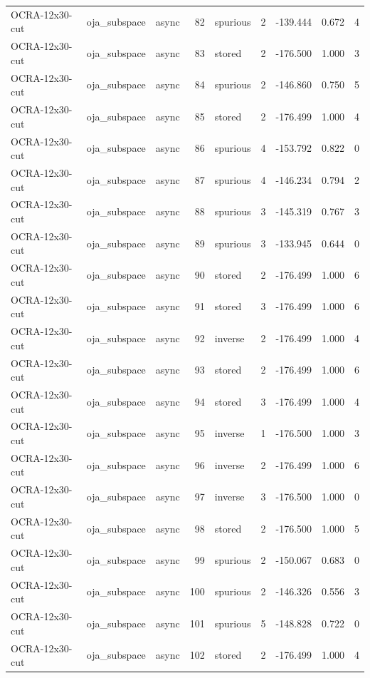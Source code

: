 \begin{tabular}{lllrlrrrr}
OCRA-12x30-cut & oja\_subspace & async & 82 & spurious & 2 & -139.444 & 0.672 & 4 \\
OCRA-12x30-cut & oja\_subspace & async & 83 & stored & 2 & -176.500 & 1.000 & 3 \\
OCRA-12x30-cut & oja\_subspace & async & 84 & spurious & 2 & -146.860 & 0.750 & 5 \\
OCRA-12x30-cut & oja\_subspace & async & 85 & stored & 2 & -176.499 & 1.000 & 4 \\
OCRA-12x30-cut & oja\_subspace & async & 86 & spurious & 4 & -153.792 & 0.822 & 0 \\
OCRA-12x30-cut & oja\_subspace & async & 87 & spurious & 4 & -146.234 & 0.794 & 2 \\
OCRA-12x30-cut & oja\_subspace & async & 88 & spurious & 3 & -145.319 & 0.767 & 3 \\
OCRA-12x30-cut & oja\_subspace & async & 89 & spurious & 3 & -133.945 & 0.644 & 0 \\
OCRA-12x30-cut & oja\_subspace & async & 90 & stored & 2 & -176.499 & 1.000 & 6 \\
OCRA-12x30-cut & oja\_subspace & async & 91 & stored & 3 & -176.499 & 1.000 & 6 \\
OCRA-12x30-cut & oja\_subspace & async & 92 & inverse & 2 & -176.499 & 1.000 & 4 \\
OCRA-12x30-cut & oja\_subspace & async & 93 & stored & 2 & -176.499 & 1.000 & 6 \\
OCRA-12x30-cut & oja\_subspace & async & 94 & stored & 3 & -176.499 & 1.000 & 4 \\
OCRA-12x30-cut & oja\_subspace & async & 95 & inverse & 1 & -176.500 & 1.000 & 3 \\
OCRA-12x30-cut & oja\_subspace & async & 96 & inverse & 2 & -176.499 & 1.000 & 6 \\
OCRA-12x30-cut & oja\_subspace & async & 97 & inverse & 3 & -176.500 & 1.000 & 0 \\
OCRA-12x30-cut & oja\_subspace & async & 98 & stored & 2 & -176.500 & 1.000 & 5 \\
OCRA-12x30-cut & oja\_subspace & async & 99 & spurious & 2 & -150.067 & 0.683 & 0 \\
OCRA-12x30-cut & oja\_subspace & async & 100 & spurious & 2 & -146.326 & 0.556 & 3 \\
OCRA-12x30-cut & oja\_subspace & async & 101 & spurious & 5 & -148.828 & 0.722 & 0 \\
OCRA-12x30-cut & oja\_subspace & async & 102 & stored & 2 & -176.499 & 1.000 & 4 \\

\end{tabular}
